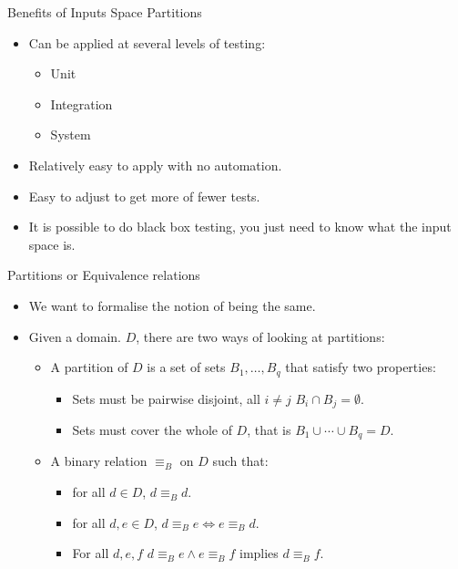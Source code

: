 \documentclass{beamer}
\begin{document}
\begin{frame}{Benefits of Inputs Space Partitions}
  \begin{itemize}
  \item Can be applied at several levels of testing:
    \begin{itemize}
    \item Unit
    \item Integration
    \item System
    \end{itemize}
  \item Relatively easy to apply with no automation.
  \item Easy to adjust to get more of fewer tests.
  \item It is possible to do black box testing, you just need to know
    what the input space is.
  \end{itemize}
    
\end{frame}
\begin{frame}{Partitions or Equivalence relations} 
  \begin{itemize}
  \item We want to formalise the notion of being the same.
  \item Given a domain. $D$, there are two ways of looking at partitions:
    \begin{itemize}
    \item A partition of $D$ is a set of sets $B_1,\ldots,B_q$  that
      satisfy two properties:
      \begin{itemize}
      \item  Sets must be pairwise disjoint, all $i\neq j$ $B_i \cap
        B_j = \emptyset$.
      \item Sets must cover the whole of $D$, that is $B_1\cup \cdots
        \cup B_q = D$.
      \end{itemize}
    \item A binary relation $\equiv_B$  on $D$ such that:
      \begin{itemize}
      \item for all $d \in D$, $d \equiv_B d$.
      \item for all $d,e \in D$, $d \equiv_B e \Leftrightarrow e
        \equiv_B d$.
      \item For all $d,e,f$ $d \equiv_B e \land e \equiv_B f$ implies
        $d \equiv_B f$.
      \end{itemize}
    \end{itemize}
  \end{itemize}
 \end{frame}
\end{document}
